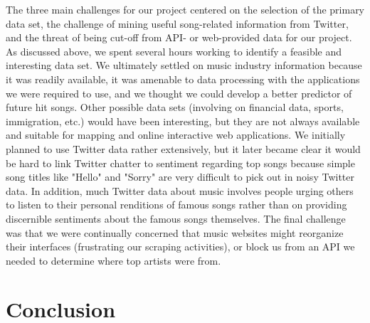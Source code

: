 \documentclass{article}
\begin{document}
The three main challenges for our project centered on the selection of the primary data set, the challenge of mining useful song-related information from Twitter, and the threat of being cut-off from API- or web-provided data for our project. As discussed above, we spent several hours working to identify a feasible and interesting data set. We ultimately settled on music industry information because it was readily available, it was amenable to data processing with the applications we were required to use, and we thought we could develop a better predictor of future hit songs. Other possible data sets (involving on financial data, sports, immigration, etc.) would have been interesting, but they are not always available and suitable for mapping and online interactive web applications. We initially planned to use Twitter data rather extensively, but it later became clear it would be hard to link Twitter chatter to sentiment regarding top songs because simple song titles like "Hello" and "Sorry" are very difficult to pick out in noisy Twitter data. In addition, much Twitter data about music involves people urging others to listen to their personal renditions of famous songs rather than on providing discernible sentiments about the famous songs themselves. The final challenge was that we were continually concerned that music websites might reorganize their interfaces (frustrating our scraping activities), or block us from an API we needed to determine where top artists were from.\vspace{2mm} 



\section{Conclusion}
\end{document}
